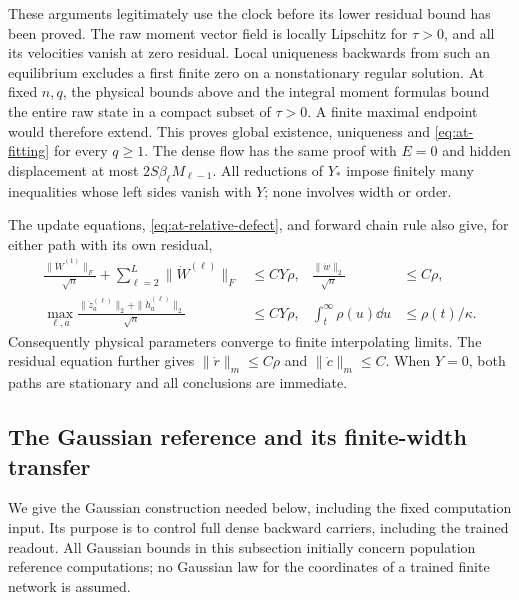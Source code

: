 These arguments legitimately use the clock before its lower residual bound
has been proved.  The raw moment vector field is locally Lipschitz for
$\tau>0$, and all its velocities vanish at zero residual.  Local
uniqueness backwards from such an equilibrium excludes a first finite zero
on a nonstationary regular solution.  At fixed $n,q$, the physical bounds
above and the integral moment formulas bound the entire raw state in a
compact subset of $\tau>0$.  A finite maximal endpoint would therefore
extend.  This proves global existence, uniqueness and \eqref{eq:at-fitting}
for every $q\ge1$.  The dense flow has the same proof with $E=0$ and
hidden displacement at most $2S\beta_\ell M_{\ell-1}$.
All reductions of $Y_*$ impose finitely many inequalities whose left
sides vanish with $Y$; none involves width or order.

The update equations, \eqref{eq:at-relative-defect}, and forward chain rule
also give, for either path with its own residual,
\begin{align}
 \frac{\|\dot W^{(1)}\|_F}{\sqrt n}
  +\sum_{\ell=2}^L\|\dot W^{(\ell)}\|_F&\le CY\rho,
 &\frac{\|\dot w\|_2}{\sqrt n}&\le C\rho,\nonumber\\
 \max_{\ell,a}\frac{\|\dot z_a^{(\ell)}\|_2+
                      \|\dot h_a^{(\ell)}\|_2}{\sqrt n}&\le CY\rho,
 &\int_t^\infty\rho(u)\dd u&\le\rho(t)/\kappa.
 \label{eq:at-speeds}
\end{align}
Consequently physical parameters converge to finite interpolating limits.
The residual equation further gives
$\|\dot r\|_m\le C\rho$ and $\|\dot c\|_m\le C$.
When $Y=0$, both paths are stationary and all conclusions are immediate.

\subsection{The Gaussian reference and its finite-width transfer}
\label{sec:at-gaussian}

We give the Gaussian construction needed below, including the fixed
computation input.  Its purpose is to control full dense backward carriers,
including the trained readout.  All Gaussian bounds in this subsection
initially concern population reference computations; no Gaussian law for
the coordinates of a trained finite network is assumed.

